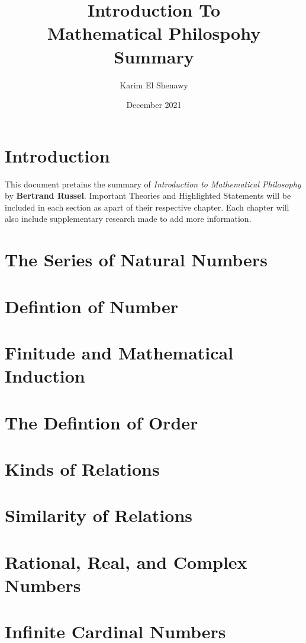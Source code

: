 \documentclass{article}
\title{Introduction To\\Mathematical Philospohy\\Summary}
\author{Karim El Shenawy}
\date{December 2021}
\begin{document}
\maketitle
\thispagestyle{empty}
\newpage
{}
\tableofcontents

\newpage

\section{Introduction}

This document pretains the summary of \textit{Introduction to Mathematical Philosophy} by \textbf{Bertrand Russel}. Important Theories and Highlighted Statements will be included in each section as apart of their respective chapter. Each chapter will also include supplementary research made to add more information.

\section{The Series of Natural Numbers}

\section{Defintion of Number}

\section{Finitude and Mathematical Induction}

\section{The Defintion of Order}

\section{Kinds of Relations}

\section{Similarity of Relations}

\section{Rational, Real, and Complex Numbers}

\section{Infinite Cardinal Numbers}
\end{document}
